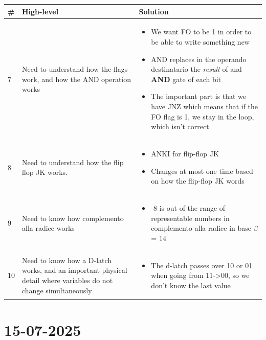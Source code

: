 \documentclass[a4paper,12pt]{article}
\begin{document}
\noindent\hspace*{-1.5cm}
    \begin{tabular}{|C{0.7cm}|C{8cm}|C{8cm}|}
        \hline
        \textbf{\#} & \textbf{High-level} & \textbf{Solution} \\
        \hline
        
        7
        &
        Need to understand how the flags work, and how the AND operation works
        &
         \begin{itemize}[label=\(\rightarrow\)]
            \item We want FO to be 1 in order to be able to write something new
            \item AND replaces in the operando destinatario the \textit{result} of and \textbf{AND} gate of each bit
            \item The important part is that we have JNZ which means that if the FO flag is 1, we stay in the loop, which isn't correct
        \end{itemize}
        \\
        \hline


        8
        &
        Need to understand how the flip flop JK works.
        &
         \begin{itemize}[label=\(\rightarrow\)]
            \item ANKI for flip-flop JK
            \item Changes at most one time based on how the flip-flop JK words
        \end{itemize}
        \\
        \hline
        

        9
        &
        Need to know how complemento alla radice works
        &
         \begin{itemize}[label=\(\rightarrow\)]
            \item -8 is out of the range of representable numbers in complemento alla radice in base $\beta$ = 14
        \end{itemize}
        \\
        \hline


        10
        &
        Need to know how a D-latch works, and an important physical detail where variables do not change simultaneously
        &
         \begin{itemize}[label=\(\rightarrow\)]
            \item The d-latch passes over 10 or 01 when going from 11->00, so we don't know the last value
        \end{itemize}
        \\
        \hline
        
    \end{tabular}



\newpage

\section{15-07-2025}
\end{document}
